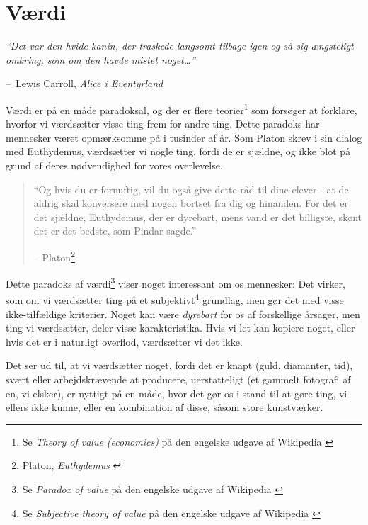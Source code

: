 \documentclass[paper=6in:9in,pagesize=pdftex,
               headinclude=on,footinclude=on,12pt]{scrbook}
\makeatletter
\newenvironment{chapquote}[2][4em]{\setlength{\@tempdima}{#1}%
   \def\chapquote@author{#2}%
   \parshape 1 \@tempdima \dimexpr\textwidth-2\@tempdima\relax%
   \itshape}{\par\normalfont\hfill--\ \chapquote@author\hspace*{\@tempdima}\par\bigskip}
\makeatother
\begin{document}
\chapter{Værdi}
\label{les:10}

\begin{chapquote}{Lewis Carroll, \textit{Alice i Eventyrland}}
\enquote{Det var den hvide kanin, der traskede langsomt tilbage igen og så sig ængsteligt omkring, som om den havde mistet noget\ldots}
\end{chapquote}

Værdi er på en måde paradoksal, og der er flere teorier\footnote{Se \textit{Theory of value (economics)} på den engelske udgave af Wikipedia \cite{wiki:theory-of-value}} som forsøger at forklare, hvorfor vi værdsætter visse ting frem for andre ting. Dette paradoks har mennesker været opmærksomme på i tusinder af år. Som Platon skrev i sin dialog med Euthydemus, værdsætter vi nogle ting, fordi de er sjældne, og ikke blot på grund af deres nødvendighed for vores overlevelse.\begin{quotation}\begin{samepage} \enquote{Og hvis du er fornuftig, vil du også give dette råd til dine elever - at de aldrig skal konversere med nogen bortset fra dig og hinanden. For det er det sjældne, Euthydemus, der er dyrebart, mens vand er det billigste, skønt det er det bedste, som Pindar sagde.} \begin{flushright} -- Platon\footnote{Platon, \textit{Euthydemus} \cite{euthydemus}}
\end{flushright}\end{samepage}\end{quotation}

Dette paradoks af værdi\footnote{Se \textit{Paradox of value} på den engelske udgave af Wikipedia \cite{wiki:paradox-of-value}} viser noget interessant om os mennesker: Det virker, som om vi værdsætter ting på et subjektivt\footnote{Se \textit{Subjective theory of value} på den engelske udgave af Wikipedia \cite{wiki:subjective-theory-of-value}} grundlag, men gør det med visse ikke-tilfældige kriterier. Noget kan være \textit{dyrebart} for os af forskellige årsager, men ting vi værdsætter, deler visse karakteristika. Hvis vi let kan kopiere noget, eller hvis det er i naturligt overflod, værdsætter vi det ikke.

Det ser ud til, at vi værdsætter noget, fordi det er knapt (guld, diamanter, tid), svært eller arbejdskrævende at producere, uerstatteligt (et gammelt fotografi af en, vi elsker), er nyttigt på en måde, hvor det gør os i stand til at gøre ting, vi ellers ikke kunne, eller en kombination af disse, såsom store kunstværker.
\end{document}
